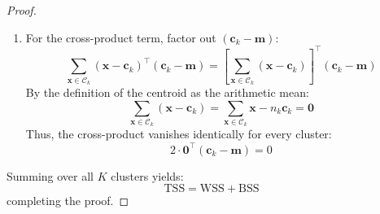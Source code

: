 \begin{proof}
\begin{enumerate}
    \item For the cross-product term, factor out $(\mathbf{c}_k - \mathbf{m})$:
    \begin{equation}
    \sum_{\mathbf{x} \in \mathcal{C}_k} (\mathbf{x} - \mathbf{c}_k)^\top (\mathbf{c}_k - \mathbf{m}) = \left[ \sum_{\mathbf{x} \in \mathcal{C}_k} (\mathbf{x} - \mathbf{c}_k) \right]^\top (\mathbf{c}_k - \mathbf{m})
    \end{equation}
    By the definition of the centroid as the arithmetic mean:
    \begin{equation}
    \sum_{\mathbf{x} \in \mathcal{C}_k} (\mathbf{x} - \mathbf{c}_k) = \sum_{\mathbf{x} \in \mathcal{C}_k} \mathbf{x} - n_k \mathbf{c}_k = \mathbf{0}
    \end{equation}
    Thus, the cross-product vanishes identically for every cluster:
    \begin{equation}
    2 \cdot \mathbf{0}^\top (\mathbf{c}_k - \mathbf{m}) = 0
    \end{equation}
\end{enumerate}
Summing over all $K$ clusters yields:
\begin{equation}
\mathrm{TSS} = \mathrm{WSS} + \mathrm{BSS}
\end{equation}
completing the proof.
\end{proof}

